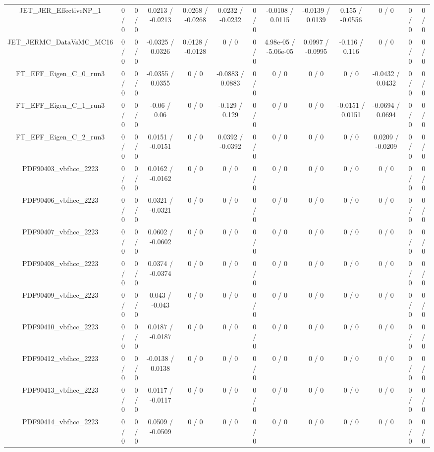 \documentclass[10pt]{article}
\begin{document}
\begin{table}[htbp]
\begin{center}
\begin{tabular}{|c|c|c|c|c|c|c|c|c|c|c|c|c|}
  JET_JER_EffectiveNP_1 & 0 / 0 & 0 / 0 & 0.0213 / -0.0213 & 0.0268 / -0.0268 & 0.0232 / -0.0232 & 0 / 0 & -0.0108 / 0.0115 & -0.0139 / 0.0139 & 0.155 / -0.0556 & 0 / 0 & 0 / 0 & 0 / 0 \\ 
  JET_JERMC_DataVsMC_MC16 & 0 / 0 & 0 / 0 & -0.0325 / 0.0326 & 0.0128 / -0.0128 & 0 / 0 & 0 / 0 & 4.98e-05 / -5.06e-05 & 0.0997 / -0.0995 & -0.116 / 0.116 & 0 / 0 & 0 / 0 & 0 / 0 \\ 
  FT_EFF_Eigen_C_0_run3 & 0 / 0 & 0 / 0 & -0.0355 / 0.0355 & 0 / 0 & -0.0883 / 0.0883 & 0 / 0 & 0 / 0 & 0 / 0 & 0 / 0 & -0.0432 / 0.0432 & 0 / 0 & 0 / 0 \\ 
  FT_EFF_Eigen_C_1_run3 & 0 / 0 & 0 / 0 & -0.06 / 0.06 & 0 / 0 & -0.129 / 0.129 & 0 / 0 & 0 / 0 & 0 / 0 & -0.0151 / 0.0151 & -0.0694 / 0.0694 & 0 / 0 & 0 / 0 \\ 
  FT_EFF_Eigen_C_2_run3 & 0 / 0 & 0 / 0 & 0.0151 / -0.0151 & 0 / 0 & 0.0392 / -0.0392 & 0 / 0 & 0 / 0 & 0 / 0 & 0 / 0 & 0.0209 / -0.0209 & 0 / 0 & 0 / 0 \\ 
  PDF90403_vbfhcc_2223 & 0 / 0 & 0 / 0 & 0.0162 / -0.0162 & 0 / 0 & 0 / 0 & 0 / 0 & 0 / 0 & 0 / 0 & 0 / 0 & 0 / 0 & 0 / 0 & 0 / 0 \\ 
  PDF90406_vbfhcc_2223 & 0 / 0 & 0 / 0 & 0.0321 / -0.0321 & 0 / 0 & 0 / 0 & 0 / 0 & 0 / 0 & 0 / 0 & 0 / 0 & 0 / 0 & 0 / 0 & 0 / 0 \\ 
  PDF90407_vbfhcc_2223 & 0 / 0 & 0 / 0 & 0.0602 / -0.0602 & 0 / 0 & 0 / 0 & 0 / 0 & 0 / 0 & 0 / 0 & 0 / 0 & 0 / 0 & 0 / 0 & 0 / 0 \\ 
  PDF90408_vbfhcc_2223 & 0 / 0 & 0 / 0 & 0.0374 / -0.0374 & 0 / 0 & 0 / 0 & 0 / 0 & 0 / 0 & 0 / 0 & 0 / 0 & 0 / 0 & 0 / 0 & 0 / 0 \\ 
  PDF90409_vbfhcc_2223 & 0 / 0 & 0 / 0 & 0.043 / -0.043 & 0 / 0 & 0 / 0 & 0 / 0 & 0 / 0 & 0 / 0 & 0 / 0 & 0 / 0 & 0 / 0 & 0 / 0 \\ 
  PDF90410_vbfhcc_2223 & 0 / 0 & 0 / 0 & 0.0187 / -0.0187 & 0 / 0 & 0 / 0 & 0 / 0 & 0 / 0 & 0 / 0 & 0 / 0 & 0 / 0 & 0 / 0 & 0 / 0 \\ 
  PDF90412_vbfhcc_2223 & 0 / 0 & 0 / 0 & -0.0138 / 0.0138 & 0 / 0 & 0 / 0 & 0 / 0 & 0 / 0 & 0 / 0 & 0 / 0 & 0 / 0 & 0 / 0 & 0 / 0 \\ 
  PDF90413_vbfhcc_2223 & 0 / 0 & 0 / 0 & 0.0117 / -0.0117 & 0 / 0 & 0 / 0 & 0 / 0 & 0 / 0 & 0 / 0 & 0 / 0 & 0 / 0 & 0 / 0 & 0 / 0 \\ 
  PDF90414_vbfhcc_2223 & 0 / 0 & 0 / 0 & 0.0509 / -0.0509 & 0 / 0 & 0 / 0 & 0 / 0 & 0 / 0 & 0 / 0 & 0 / 0 & 0 / 0 & 0 / 0 & 0 / 0 \\ 

\end{tabular}
\end{center}
\end{table}
\end{document}

